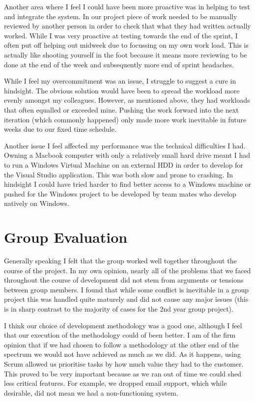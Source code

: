 \documentclass[paper=a4, fontsize=11pt]{scrartcl}	%
\numberwithin{equation}{section}															%
\numberwithin{figure}{section}																%
\numberwithin{table}{section}
\begin{document}
Another area where I feel I could have been more proactive was in helping to test and integrate the system. In our project piece of work needed to be manually reviewed by another person in order to check that what they had written actually worked. While I was very proactive at testing towards the end of the sprint, I often put off helping out midweek due to focussing on my own work load. This is actually like shooting yourself in the foot because it means more reviewing to be done at the end of the week and subsequently more end of sprint headaches.  

While I feel my overcommitment was an issue, I struggle to suggest a cure in hindsight. The obvious solution would have been to spread the workload more evenly amongst my colleagues. However, as mentioned above, they had workloads that often equalled or exceeded mine. Pushing the work forward into the next iteration (which commonly happened) only made more work inevitable in future weeks due to our fixed time schedule.

Another issue I feel affected my performance was the technical difficulties I had. Owning a Macbook computer with only a relatively small hard drive meant I had to run a Windows Virtual Machine on an external HDD in order to develop for the Visual Studio application. This was both slow and prone to crashing. In hindsight I could have tried harder to find better access to a Windows machine or pushed for the Windows project to be developed by team mates who develop natively on Windows.


\section*{Group Evaluation}
Generally speaking I felt that the group worked well together throughout the course of the project. In my own opinion, nearly all of the problems that we faced throughout the course of development did not stem from arguments or tensions between group members. I found that while some conflict is inevitable in a group project this was handled quite maturely and did not cause any major issues (this is in sharp contrast to the majority of cases for the 2nd year group project). 

I think our choice of development methodology was a good one, although I feel that our execution of the methodology could of been better. I am of the firm opinion that if we had chosen to follow a methodology at the other end of the spectrum we would not have achieved as much as we did. As it happens, using Scrum allowed us prioritise tasks by how much value they had to the customer. This proved to be very important because as we ran out of time we could shed less critical features. For example, we dropped email support, which while desirable, did not mean we had a non-functioning system.
\end{document}
